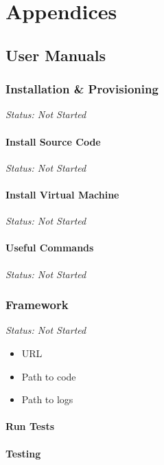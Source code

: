 \chapter*{Appendices}
\renewcommand{\thesection}{\Alph{section}}

\section{User Manuals}

\subsection{Installation \& Provisioning}

\emph{Status: Not Started}

\subsubsection{Install Source Code}

\emph{Status: Not Started}

\subsubsection{Install Virtual Machine}

\emph{Status: Not Started}

\subsubsection{Useful Commands}

\emph{Status: Not Started}

\subsection{Framework}

\emph{Status: Not Started}

\begin{itemize}
\item URL
\item Path to code
\item Path to logs
\end{itemize}

\subsubsection{Run Tests}

\subsubsection{Testing}

